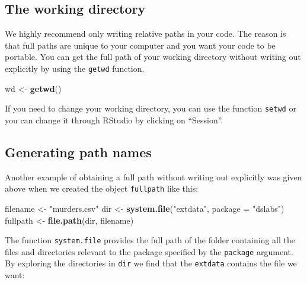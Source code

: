 \documentclass[
]{krantz}
\newenvironment{Shaded}{\begin{snugshade}}{\end{snugshade}}
\newcommand{\CommentTok}[1]{\textcolor[rgb]{0.37,0.37,0.37}{\textit{#1}}}
\newcommand{\DataTypeTok}[1]{\textcolor[rgb]{0.27,0.27,0.27}{#1}}
\newcommand{\KeywordTok}[1]{\textcolor[rgb]{0.27,0.27,0.27}{\textbf{#1}}}
\newcommand{\NormalTok}[1]{#1}
\newcommand{\OperatorTok}[1]{\textcolor[rgb]{0.43,0.43,0.43}{\textbf{#1}}}
\newcommand{\StringTok}[1]{\textcolor[rgb]{0.5,0.5,0.5}{#1}}
\begin{document}
\hypertarget{the-working-directory}{%
\subsection{The working directory}\label{the-working-directory}}

We highly recommend only writing relative paths in your code. The reason is that full paths are unique to your computer and you want your code to be portable.
You can get the full path of your working directory without writing out explicitly by using the \texttt{getwd} function.

\begin{Shaded}
\begin{Highlighting}[]
\NormalTok{wd <-}\StringTok{ }\KeywordTok{getwd}\NormalTok{()}
\end{Highlighting}
\end{Shaded}

If you need to change your working directory, you can use the function \texttt{setwd} or you can change it through RStudio by clicking on ``Session''.

\hypertarget{generating-path-names}{%
\subsection{Generating path names}\label{generating-path-names}}

Another example of obtaining a full path without writing out explicitly was given above when we created the object \texttt{fullpath} like this:

\begin{Shaded}
\begin{Highlighting}[]
\NormalTok{filename <-}\StringTok{ "murders.csv"}
\NormalTok{dir <-}\StringTok{ }\KeywordTok{system.file}\NormalTok{(}\StringTok{"extdata"}\NormalTok{, }\DataTypeTok{package =} \StringTok{"dslabs"}\NormalTok{) }
\NormalTok{fullpath <-}\StringTok{ }\KeywordTok{file.path}\NormalTok{(dir, filename)}
\end{Highlighting}
\end{Shaded}

The function \texttt{system.file} provides the full path of the folder containing all the files and directories relevant to the package specified by the \texttt{package} argument. By exploring the directories in \texttt{dir} we find that the \texttt{extdata} contains the file we want:

\begin{Shaded}
\end{Shaded}
\end{document}
